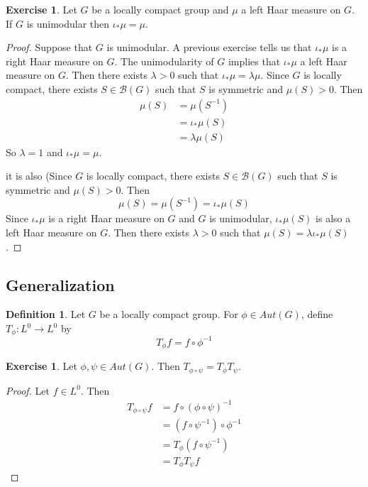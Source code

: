 \documentclass[12pt]{amsart}
\theoremstyle{definition}
\newtheorem{defn}[definition]{Definition}
\newtheorem{ex}[definition]{Exercise}
\newcommand{\lam}{\lambda}
\newcommand{\MB}{\mathcal{B}}
\begin{document}
	\begin{ex}
		Let $G$ be a locally compact group and $\mu$ a left Haar measure on $G$. If $G$ is unimodular then $\iota_*\mu = \mu$.
	\end{ex}

	\begin{proof}
		Suppose that $G$ is unimodular. A previous exercise tells us that $\iota_*\mu$ is a right Haar measure on $G$. The unimodularity of $G$ implies that $\iota_*\mu$ a left Haar measure on $G$. Then there exists $\lam >0$ such that $\iota_*\mu = \lam \mu$. Since $G$ is locally compact, there exists $S \in \MB(G)$ such that $S$ is symmetric and $\mu(S) > 0$. Then 
		\begin{align*}
			\mu(S) 
			& = \mu(S^{-1}) \\
			& = \iota_*\mu(S) \\
			& = \lam \mu(S) 
		\end{align*}	
		So $\lam = 1$ and $\iota_*\mu = \mu$.

		it is also (Since $G$ is locally compact, there exists $S \in \MB(G)$ such that $S$ is symmetric and $\mu(S) > 0$. Then 
		$$\mu(S) = \mu(S^{-1}) = \iota_*\mu(S)$$ Since $\iota_*\mu$ is a right Haar measure on $G$ and $G$ is unimodular, $\iota_*\mu(S)$ is also a left Haar measure on $G$. Then there exists $\lam > 0$ such that $\mu(S) = \lam\iota_*\mu(S)$.
	\end{proof}




	\newpage
	
	\subsection{Generalization}
	
	\begin{defn}
		Let $G$ be a locally compact group. For $\phi \in Aut(G)$, define $T_{\phi} : L^0 \rightarrow L^0$ by $$T_{\phi}f = f \circ \phi^{-1}$$ 
	\end{defn}

	\begin{ex}
		Let $\phi, \psi \in Aut(G)$. Then $T_{\phi  \circ \psi} = T_{\phi}T_{\psi}$. 
	\end{ex}

	\begin{proof}
		Let $f \in L^0$. Then 
		\begin{align*}
			T_{\phi \circ \psi} f 
			& = f \circ ({\phi \circ \psi})^{-1} \\ 
			& = (f \circ \psi^{-1}) \circ \phi^{-1} \\
			& = T_{\phi} (f \circ  \psi^{-1}) \\
			& = T_{\phi} T_{\psi} f  
		\end{align*}
	\end{proof}
\end{document}
